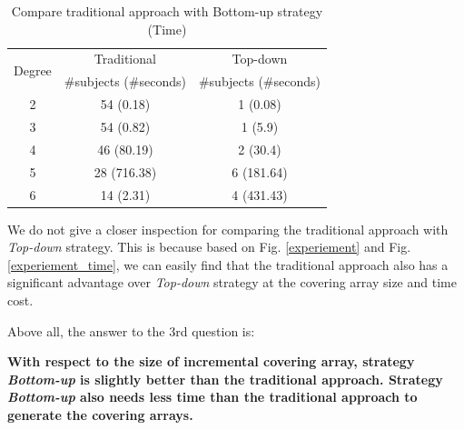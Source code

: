 \documentclass[conference]{IEEEtran}
\theoremstyle{definition}
\begin{document}
\begin{table}[!ht]
\caption{Compare traditional approach with Bottom-up strategy (Time)}
\label{statistic_of_subjects_time_traditional}
\center
    \begin{tabular}{|c|c|c|} \hline
    \multirow{2}{*}{Degree} & Traditional & Top-down \\\cline{2-3}
 & \#subjects (\#seconds) & \#subjects (\#seconds) \\\hline
2 & 54 (0.18) & 1 (0.08) \\
3 & 54 (0.82) & 1 (5.9)  \\
4 & 46 (80.19) & 2 (30.4)  \\
5 & 28 (716.38) & 6 (181.64)  \\
6 & 14 (2.31) & 4 (431.43) \\ \hline
    \end{tabular}%
\end{table}

We do not give a closer inspection for comparing the traditional approach with \emph{Top-down} strategy. This is because based on Fig. \ref{experiement} and Fig. \ref{experiement_time}, we can easily find that the traditional approach also has a significant advantage over \emph{Top-down} strategy at the covering array size and time cost.

Above all, the answer to the 3rd question is:

\textbf{With respect to the size of incremental covering array, strategy \emph{Bottom-up} is slightly better than the traditional approach. Strategy \emph{Bottom-up} also needs less time than the traditional approach to generate the covering arrays.}



\end{document}
